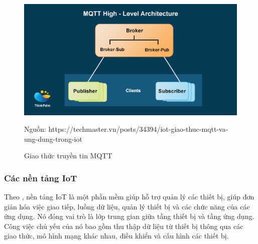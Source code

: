 
\begin{figure}[h!]
	\center
	\includegraphics[scale=0.6]{image/mqtt}\\
	\caption{Giao thức truyền tin MQTT}
	Nguồn: https://techmaster.vn/posts/34394/iot-giao-thuc-mqtt-va-ung-dung-trong-iot
\end{figure} 




\subsubsection{Các nền tảng IoT}
Theo \cite{iotplatform}, nền tảng IoT là một phần mềm giúp hỗ trợ quản lý các thiết bị, giúp đơn giản hóa việc giao tiếp, luồng dữ liệu, quản lý thiết bị và các chức năng của các ứng dụng. Nó đóng vai trò là lớp trung gian giữa tầng thiết bị và tầng ứng dụng. Công việc chủ yếu của nó bao gồm thu thập dữ liệu từ thiết bị thông qua các giao thức, mô hình mạng khác nhau, điều khiển và cấu hình các thiết bị. 
\clearpage

